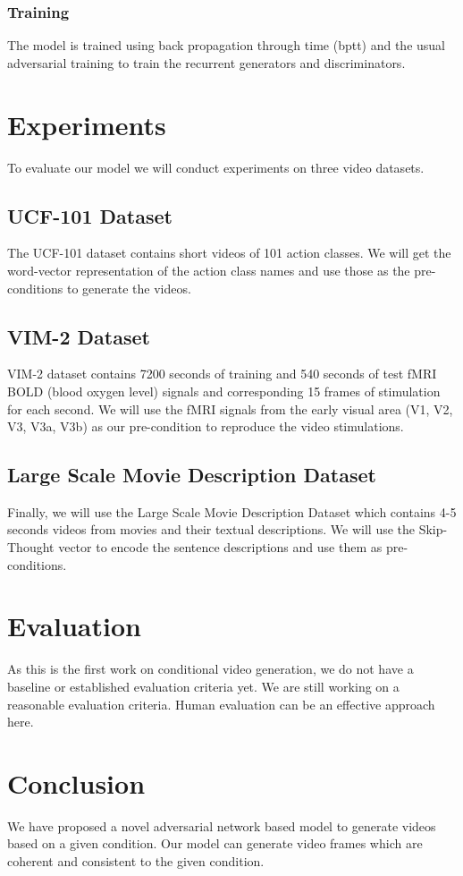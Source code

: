 \documentclass{article}
\begin{document}
\subsubsection{Training} The model is trained using back propagation through time (bptt) and the usual adversarial training to train the recurrent generators and discriminators. 

\section{Experiments}
\label{experiments}
To evaluate our model we will conduct experiments on three video datasets.

\subsection{UCF-101 Dataset}
The UCF-101 \cite{uCF101} dataset contains short videos of 101 action classes. We will get the word-vector representation of the action class names and use those as the pre-conditions to generate the videos.

\subsection{VIM-2 Dataset}
VIM-2 dataset \cite{recVEBA} contains 7200 seconds of training and 540 seconds of test fMRI BOLD (blood oxygen level) signals and corresponding 15 frames of stimulation for each second. We will use the fMRI signals from the early visual area (V1, V2, V3, V3a, V3b) as our pre-condition to reproduce the video stimulations.

\subsection{Large Scale Movie Description Dataset}
Finally, we will use the Large Scale Movie Description Dataset \cite{movieDes} which contains 4-5 seconds videos from movies and their textual descriptions. We will use the Skip-Thought vector to encode the sentence descriptions and use them as pre-conditions.

\section{Evaluation}
As this is the first work on conditional video generation, we do not have a baseline or established evaluation criteria yet. We are still working on a reasonable evaluation criteria. Human evaluation can be an effective approach here.

\section{Conclusion}
We have proposed a novel adversarial network based model to generate videos based on a given condition. Our model can generate video frames which are coherent and consistent to the given condition. 

\small


\end{document}
